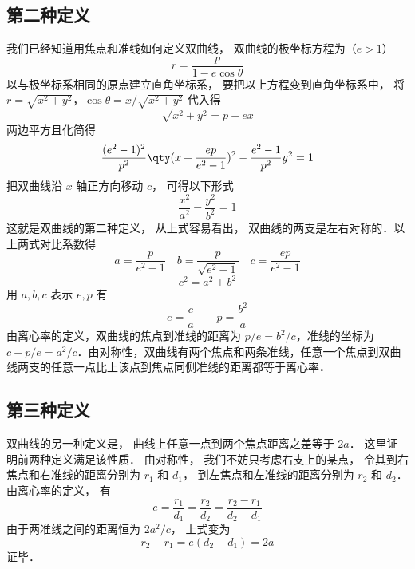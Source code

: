 

\subsection{第二种定义}
我们已经知道用焦点和准线如何定义双曲线， 双曲线的极坐标方程为（$e>1$）
\begin{equation}
r = \frac{p}{1 - e\cos \theta }
\end{equation}
以与极坐标系相同的原点建立直角坐标系， 要把以上方程变到直角坐标系中， 将$r = \sqrt{x^2 + y^2}$，$\cos \theta  = x/\sqrt{x^2 + y^2}$ 代入得
\begin{equation}
\sqrt{x^2 + y^2}  = p + ex
\end{equation}
两边平方且化简得
\begin{equation}
\frac{(e^2 - 1)^2}{p^2} \qty(x + \frac{ep}{e^2 - 1} )^2 - \frac{e^2 - 1}{p^2} y^2 = 1
\end{equation}
把双曲线沿 $x$ 轴正方向移动 $c$， 可得以下形式
\begin{equation}\label{Hypb3_eq4}
\frac{x^2}{a^2} - \frac{y^2}{b^2} = 1
\end{equation}
这就是双曲线的第二种定义， 从上式容易看出， 双曲线的两支是左右对称的．以上两式对比系数得
\begin{equation}
a = \frac{p}{e^2 - 1} \quad  b = \frac{p}{\sqrt{e^2 - 1} } \quad c = \frac{ep}{e^2 - 1}
\end{equation}
\begin{equation}
c^2 = a^2 + b^2
\end{equation}
用 $a, b, c$ 表示 $e,p$ 有
\begin{equation}
e = \frac{c}{a} \qquad p = \frac{b^2}{a}
\end{equation}
由离心率的定义，双曲线的焦点到准线的距离为 $p/e=b^2/c$，准线的坐标为 $c-p/e = a^2/c$．由对称性，双曲线有两个焦点和两条准线，任意一个焦点到双曲线两支的任意一点比上该点到焦点同侧准线的距离都等于离心率．

\subsection{第三种定义}
双曲线的另一种定义是， 曲线上任意一点到两个焦点距离之差等于 $2a$． 这里证明前两种定义满足该性质． 由对称性， 我们不妨只考虑右支上的某点， 令其到右焦点和右准线的距离分别为 $r_1$ 和 $d_1$， 到左焦点和左准线的距离分别为 $r_2$ 和 $d_2$． 由离心率的定义， 有
\begin{equation}
e = \frac{r_1}{d_1} = \frac{r_2}{d_2} = \frac{r_2 - r_1}{d_2 - d_1}
\end{equation}
由于两准线之间的距离恒为 $2a^2/c$， 上式变为
\begin{equation}
r_2 - r_1 = e(d_2 - d_1) = 2a
\end{equation}
证毕．

